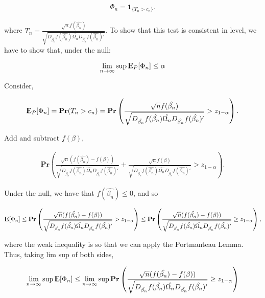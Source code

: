 \documentclass[12pt]{paper}
\newcommand{\E}{{\rm I\kern-.3em E}}
\begin{document}
\begin{align*}
\Phi_n=\textbf{1}_{\{T_n>c_n\}}.
\end{align*}

where $T_n=\frac{\sqrt{n}f(\hat{\beta_n})}{\sqrt{D_{\hat{\beta_n}}f(\hat{\beta_n}) \hat{\Omega_n} D_{\hat{\beta_n}}f(\hat{\beta_n})'}}$. To show that this test is consistent in level, we have to show that, under the null:

\begin{align*}
\lim_{n \to \infty} \sup \E_P[\Phi_n] \leq \alpha
\end{align*}

Consider,

\begin{align*}
\E_P[\Phi_n]=\textbf{Pr}(T_n>c_n)=\textbf{Pr}\left(\frac{\sqrt{n}f(\hat{\beta_n})}{\sqrt{D_{\hat{\beta_n}}f(\hat{\beta_n}) \hat{\Omega_n} D_{\hat{\beta_n}}f(\hat{\beta_n})'}}>z_{1-\alpha} \right).
\end{align*}

Add and subtract $f(\beta)$,

\begin{align*}
\textbf{Pr}\left(
\frac{\sqrt{n}(f(\hat{\beta_n})-f(\beta))}{\sqrt{D_{\hat{\beta_n}}f(\hat{\beta_n}) \hat{\Omega_n} D_{\hat{\beta_n}}f(\hat{\beta_n})'}}
+
\frac{\sqrt{n}f(\beta)}{\sqrt{D_{\hat{\beta_n}}f(\hat{\beta_n}) \hat{\Omega_n} D_{\hat{\beta_n}}f(\hat{\beta_n})'}}
>
z_{1-\alpha}
\right).
\end{align*}

Under the null, we have that $f(\hat{\beta_n})\leq0$, and so

\begin{align*}
\E[\Phi_n]
\leq
\textbf{Pr}\left(
\frac{\sqrt{n}(f(\hat{\beta_n})-f(\beta))}{\sqrt{D_{\hat{\beta_n}}f(\hat{\beta_n}) \hat{\Omega_n} D_{\hat{\beta_n}}f(\hat{\beta_n})'}}
>
z_{1-\alpha}
\right)
\leq
\textbf{Pr}\left(
\frac{\sqrt{n}(f(\hat{\beta_n})-f(\beta))}{\sqrt{D_{\hat{\beta_n}}f(\hat{\beta_n}) \hat{\Omega_n} D_{\hat{\beta_n}}f(\hat{\beta_n})'}}
\geq
z_{1-\alpha}
\right),
\end{align*}

where the weak inequality is so that we can apply the Portmanteau Lemma. Thus, taking lim sup of both sides,

\begin{align*}
\lim_{n \to \infty}\sup \E[\Phi_n] 
\leq
\lim_{n \to \infty} \sup \textbf{Pr}\left(
\frac{\sqrt{n}(f(\hat{\beta_n})-f(\beta))}{\sqrt{D_{\hat{\beta_n}}f(\hat{\beta_n}) \hat{\Omega_n} D_{\hat{\beta_n}}f(\hat{\beta_n})'}}
\geq
z_{1-\alpha}
\right)
\end{align*}
\end{document}
